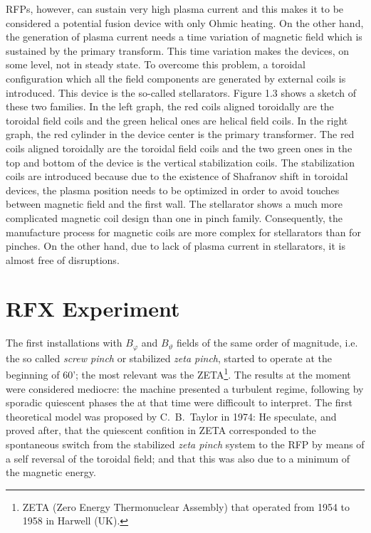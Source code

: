 RFPs, however, can sustain very high plasma current and this makes it to be considered a potential fusion device with only Ohmic heating. On the other hand, the generation of plasma current needs a time variation of magnetic field which is sustained by the primary transform. This time variation makes the devices, on some level, not in steady state. To overcome this problem, a toroidal configuration which all the field components are generated by external coils is introduced. This device is the so-called stellarators. Figure 1.3 shows a sketch of these two families. In the left graph, the red coils aligned toroidally are the toroidal field coils and the green helical ones are helical field coils. In the right graph, the red cylinder in the device center is the primary transformer. The red coils aligned toroidally are the toroidal field coils and the two green ones in the top and bottom of the device is the vertical stabilization coils. The stabilization coils are introduced because due to the existence of Shafranov shift in toroidal devices, the plasma position needs to be optimized in order to avoid touches between magnetic field and the first wall. 
The stellarator shows a much more complicated magnetic coil design than one in pinch family. Consequently, the manufacture process for magnetic coils are more complex for stellarators than for pinches. On the other hand, due to lack of plasma current in stellarators, it is almost free of disruptions.

\section{RFX Experiment}
The first installations with $B_\varphi$ and $B_\vartheta$ fields of the same order of magnitude, i.e. the so called \textit{screw pinch} or stabilized \textit{zeta pinch}, started to operate at the beginning of 60'; the most relevant was the ZETA\footnote{ZETA (Zero Energy Thermonuclear Assembly) that operated from 1954 to 1958 in Harwell (UK).}. The results at the moment were considered mediocre: the machine presented a turbulent regime, following by sporadic quiescent phases the at that time were difficoult to interpret. The first theoretical model was proposed by C.~B.~Taylor in 1974\cite{taylor}: He speculate, and proved after, that the quiescent confition in ZETA corresponded to the spontaneous switch from the stabilized \textit{zeta pinch} system to the RFP by means of a self reversal of the toroidal field; and that this was also due to a minimum of the magnetic energy.

